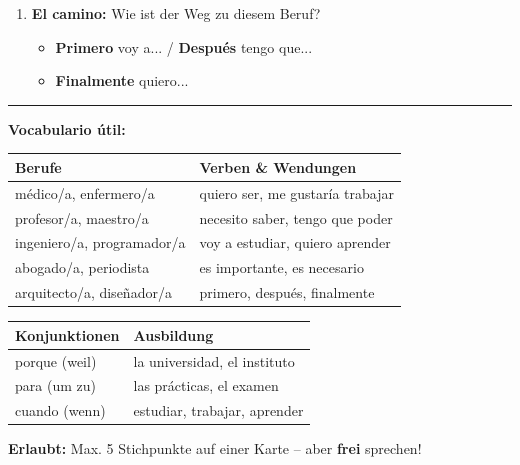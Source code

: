 \documentclass[11pt, a4paper]{article}
\begin{document}
\begin{center}
{\begin{minipage}{0.95\textwidth}
\begin{enumerate}[label=\textbf{\arabic*.}, leftmargin=2em, itemsep=0.8em]
    \item {\large\bfseries El camino:} Wie ist der Weg zu diesem Beruf?
    \begin{itemize}[leftmargin=1.5em]
        \item \textbf{Primero} voy a... / \textbf{Después} tengo que...
        \item \textbf{Finalmente} quiero...
    \end{itemize}
\end{enumerate}

\vspace{0.5cm}
\hrule
\vspace{0.5cm}

{\Large\bfseries Vocabulario útil:}

\vspace{0.3cm}

\begin{tabularx}{\textwidth}{@{}|X|X|@{}}
\hline
\rowcolor{gruppeB!10}
\textbf{Berufe} & \textbf{Verben \& Wendungen} \\
\hline
médico/a, enfermero/a & quiero ser, me gustaría trabajar \\
profesor/a, maestro/a & necesito saber, tengo que poder \\
ingeniero/a, programador/a & voy a estudiar, quiero aprender \\
abogado/a, periodista & es importante, es necesario \\
arquitecto/a, diseñador/a & primero, después, finalmente \\
\hline
\end{tabularx}

\vspace{0.3cm}

\begin{tabularx}{\textwidth}{@{}|X|X|@{}}
\hline
\rowcolor{gruppeB!10}
\textbf{Konjunktionen} & \textbf{Ausbildung} \\
\hline
porque (weil) & la universidad, el instituto \\
para (um zu) & las prácticas, el examen \\
cuando (wenn) & estudiar, trabajar, aprender \\
\hline
\end{tabularx}

\vspace{0.5cm}

\begin{center}
\colorbox{gruppeB!20}{\parbox{0.9\textwidth}{\centering
\textbf{Erlaubt:} Max. 5 Stichpunkte auf einer Karte -- aber \textbf{frei} sprechen!
}}
\end{center}

\vspace{0.3cm}
\end{minipage}%
}
\end{center}
\end{document}
